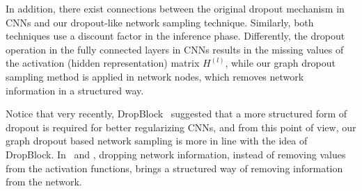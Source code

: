 {{In addition, there exist connections between the original dropout mechanism in CNNs and our dropout-like network sampling technique. 
Similarly, both techniques use a discount factor in the inference phase. 
Differently, the dropout operation in the fully connected layers in CNNs results in the missing values of the activation (hidden representation) matrix $H^{(l)}$, while our graph dropout sampling method is applied in network nodes, which removes network information in a structured way. 

Notice that very recently, DropBlock~\cite{ghiasi2018dropblock} suggested that a more structured form of dropout is required for better regularizing CNNs, and from this point of view, our graph dropout based network sampling is more in line with the idea of DropBlock. In \drop\ and \dm, dropping network information, instead of removing values from the activation functions, brings a structured way of removing information from the network. 
}






}%
